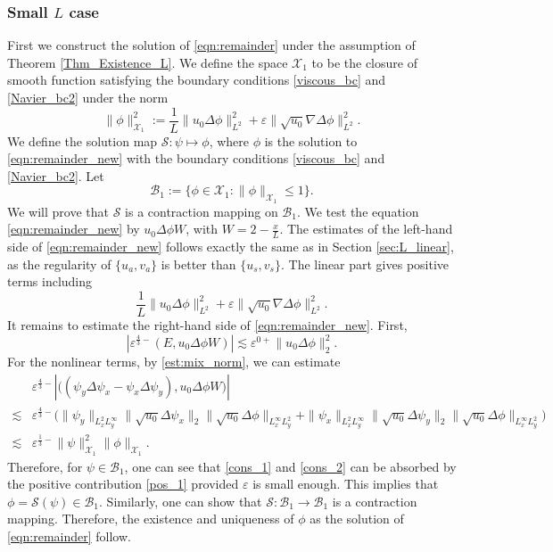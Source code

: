 \documentclass[reqno, 11pt]{amsart}
\theoremstyle{plain}
\theoremstyle{definition}
\theoremstyle{remark}
\numberwithin{equation}{section}
\newcommand\cB{\mathcal{B}}
\newcommand\cS{\mathcal{S}}
\newcommand\cX{\mathcal{X}}
\begin{document}
\subsubsection{Small $L$ case}
First we construct the solution of \eqref{eqn:remainder} under the assumption of Theorem \ref{Thm_Existence_L}. We define the space $\cX_1$ to be the closure of smooth function satisfying the boundary conditions \eqref{viscous_bc} and \eqref{Navier_bc2} under the norm
$$
\| \phi \|_{\cX_1}^2:=  \frac{1}{L} \| u_0 \Delta \phi \|_{L^2}^2 + \varepsilon  \| \sqrt{u_0} \nabla \Delta \phi \|_{L^2}^2.
$$
We define the solution map $\cS: \psi \mapsto \phi$, where $\phi$ is the solution to \eqref{eqn:remainder_new} with the boundary conditions \eqref{viscous_bc} and \eqref{Navier_bc2}. Let 
$$
\cB_1 := \{ \phi \in \cX_1 : \| \phi \|_{\cX_1} \le 1 \}.
$$
We will prove that $\cS$ is a contraction mapping on $\cB_1$. We test the equation \eqref{eqn:remainder_new} by $u_0 \Delta \phi W$, with $W = 2 - \frac{x}{L}$. The estimates of the left-hand side of \eqref{eqn:remainder_new} follows exactly the same as in Section \ref{sec:L_linear}, as the regularity of $\{u_a,v_a\}$ is better than $\{u_s, v_s\}$. The linear part gives positive terms including
\begin{equation}\label{pos_1}
\frac{1}{L} \| u_0 \Delta \phi \|_{L^2}^2 + \varepsilon  \| \sqrt{u_0} \nabla \Delta \phi \|_{L^2}^2.
\end{equation}
It remains to estimate the right-hand side of \eqref{eqn:remainder_new}. First,
\begin{equation}\label{cons_1}
|\varepsilon^{\frac{4}{3}-}(E, u_0 \Delta \phi W)| \lesssim \varepsilon^{0+} \| u_0 \Delta \phi \|_{2}^2.
\end{equation}
For the nonlinear terms, by \eqref{est:mix_norm}, we can estimate
\begin{equation}\label{cons_2}
\begin{aligned}
&\varepsilon^{\frac{4}{3}-} |\Big((\psi_y \Delta \psi_x - \psi_x \Delta \psi_y), u_0 \Delta \phi W \Big)|\\
\lesssim & \varepsilon^{\frac{4}{3}-}\Big( \| \psi_y\|_{L^2_x L^\infty_y} \| \sqrt{u_0}\Delta \psi_x\|_2 \| \sqrt{u_0}\Delta \phi\|_{L^\infty_x L^2_y} + \| \psi_x\|_{L^2_x L^\infty_y} \| \sqrt{u_0}\Delta \psi_y\|_2 \| \sqrt{u_0}\Delta \phi\|_{L^\infty_x L^2_y}\Big)\\
\lesssim &\varepsilon^{\frac{1}{3}-} \| \psi \|_{\cX_1}^2 \| \phi\|_{\cX_1}.
\end{aligned}
\end{equation}
Therefore, for $\psi \in \cB_1$, one can see that \eqref{cons_1} and \eqref{cons_2} can be absorbed by the positive contribution \eqref{pos_1} provided $\varepsilon$ is small enough. This implies that $\phi = \cS(\psi) \in \cB_1$. Similarly, one can show that $\cS : \cB_1 \to \cB_1$ is a contraction mapping. Therefore, the existence and uniqueness of $\phi$ as the solution of \eqref{eqn:remainder} follow.
\end{document}
